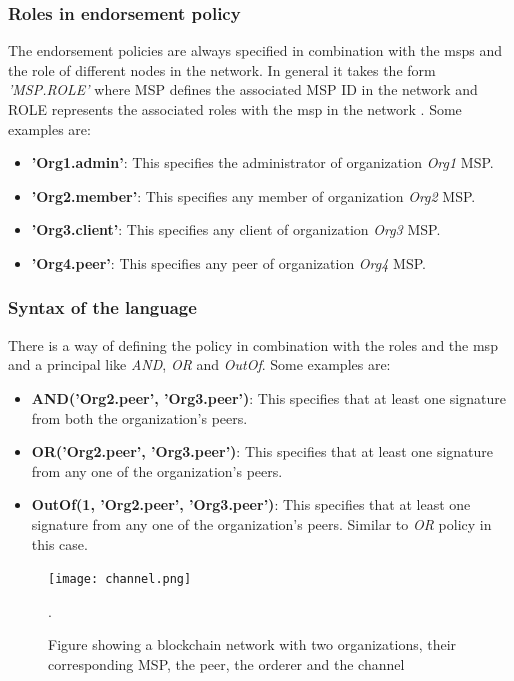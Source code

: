 \documentclass[
  a4paper,  %
  twoside,  %
  bibliography=totoc,
  headsepline,
  cleardoublepage=empty,
  parskip=half,
  draft=false
]{scrbook}
\begin{document}
\subsubsection{Roles in endorsement policy}
The endorsement policies are always specified in combination with the \glspl{msp} and the role of different nodes in the network. In general it takes the form \textit{'MSP.ROLE'} where MSP defines the associated MSP ID in the network and ROLE represents the associated roles with the \gls{msp} in the network \cite{Endorsement}. Some examples are:
\begin{itemize}
\item \textbf{'Org1.admin'}: This specifies the administrator of organization \textit{Org1} MSP.
\item \textbf{'Org2.member'}: This specifies any member of organization \textit{Org2} MSP.
\item \textbf{'Org3.client'}: This specifies any client of organization \textit{Org3} MSP.
\item \textbf{'Org4.peer'}: This specifies any peer of organization \textit{Org4} MSP.
\end{itemize}

\subsubsection{Syntax of the language}
There is a way of defining the policy in combination with the roles and the msp and a principal like \textit{AND}, \textit{OR} and \textit{OutOf}. Some examples are:
\begin{itemize}
\item \textbf{AND('Org2.peer', 'Org3.peer')}: This specifies that at least one signature from both the organization's peers.
\item \textbf{OR('Org2.peer', 'Org3.peer')}: This specifies that at least one signature from any one of the organization's peers.
\item \textbf{OutOf(1, 'Org2.peer', 'Org3.peer')}: This specifies that at least one signature from any one of the organization's peers. Similar to \textit{OR} policy in this case.
\end{itemize}

\begin{figure}[t!]
\begin{center}
\texttt{[image: channel.png]}
\caption{Figure showing a blockchain network with two organizations, their corresponding MSP, the peer, the orderer and the channel \cite{Membership}}.
\label{fig:channel}
\end{center}
\end{figure}
\end{document}
